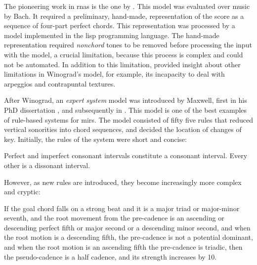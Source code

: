 


The pioneering work in \glspl{rna} is the one by
\textcite{winograd1968linguistics}. This model was evaluated
over music by Bach. It required a preliminary, hand-made,
representation of the score as a sequence of four-part
perfect chords. This representation was processed by a model
implemented in the \gls{lisp} programming language. The
hand-made representation required \emph{nonchord} tones to
be removed before processing the input with the model, a
crucial limitation, because this process is complex and
could not be automated. In addition to this limitation,
\textcite{temperley1997algorithm} provided insight about
other limitations in Winograd's model, for example, its
incapacity to deal with arpeggios and contrapuntal textures.

After Winograd, an \emph{expert system} model was introduced
by Maxwell, first in his PhD dissertation
\parencite{maxwell1984artificial}, and subsequently in
\textcite{maxwell1992expert}. This model is one of the best
examples of rule-based systems for \glspl{mir}. The model
consisted of fifty five rules that reduced vertical
sonorities into chord sequences, and decided the location of
changes of key. Initially, the rules of the system were
short and concise:

\begin{italicquotes}
    Perfect and imperfect consonant intervals constitute a
    consonant interval. Every other is a dissonant interval.
\end{italicquotes}


However, as new rules are introduced, they become
increasingly more complex and cryptic:

\begin{italicquotes}
    If the goal chord falls on a strong beat and it is a
    major triad or major-minor seventh, and the root
    movement from the pre-cadence is an ascending or
    descending perfect fifth or major second or a descending
    minor second, and when the root motion is a descending
    fifth, the pre-cadence is not a potential dominant, and
    when the root motion is an ascending fifth the
    pre-cadence is triadic, then the pseudo-cadence is a
    half cadence, and its strength increases by 10.
\end{italicquotes}

